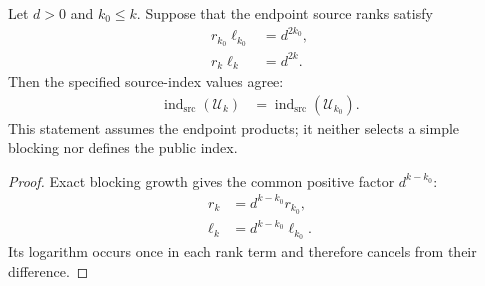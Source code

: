 \begin{lemma}
    \label{thm:mpu_specified_source_index_blocking_invariance}
    \leanok
    Let $d>0$ and $k_0\leq k$. Suppose that the endpoint source ranks satisfy
    \begin{align}
        r_{k_0}\ell_{k_0} & =d^{2k_0}, \\
        r_k\ell_k         & =d^{2k}.
    \end{align}
    Then the specified source-index values agree:
    \begin{align}
        \operatorname{ind}_{\mathrm{src}}(\mathcal U_k)
         & =\operatorname{ind}_{\mathrm{src}}(\mathcal U_{k_0}).
    \end{align}
    This statement assumes the endpoint products; it neither selects a simple
    blocking nor defines the public index.
\end{lemma}

\begin{proof}\leanok
    Exact blocking growth gives the common positive factor $d^{k-k_0}$:
    \begin{align}
        r_k    & =d^{k-k_0}r_{k_0},    \\
        \ell_k & =d^{k-k_0}\ell_{k_0}.
    \end{align}
    Its logarithm occurs once in each rank term and therefore cancels from
    their difference.
\end{proof}

